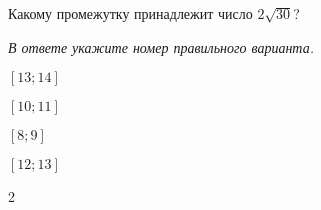 \begin{ex}
	Какому промежутку принадлежит число $2\sqrt{30}$?
	
	\textit{В ответе укажите номер правильного варианта.}
	\begin{enumcols}[columns=4]
			\item $[13;14]$
			\item $[10;11]$
			\item $[8;9]$
			\item $[12;13]$
		\end{enumcols}
	\begin{answer}
		2
	\end{answer}
\end{ex}